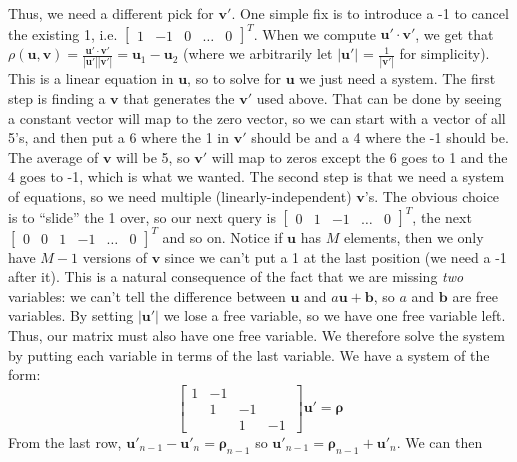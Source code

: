 \documentclass[11pt, oneside]{article}
\renewcommand{\vec}[1]{\bm{#1}}
\theoremstyle{plain}
\theoremstyle{definition}
\begin{document}
Thus, we need a different pick for \( \vec{v}' \). One simple fix is to
introduce a -1 to cancel the existing 1, i.e. \( \begin{bmatrix} 1 & -1 & 0 &
\dots & 0 \end{bmatrix}^T \). When we compute \( \vec{u}' \cdot \vec{v}' \), we
get that \( \rho(\vec{u}, \vec{v}) = \frac{\vec{u}' \cdot \vec{v}'}{|\vec{u}'|
|\vec{v}'|}= \vec{u}_1 - \vec{u}_2 \) (where we arbitrarily let \( |\vec{u}'|
\) = \( \frac{1}{|\vec{v}'|} \) for simplicity). This is a linear equation in
\( \vec{u} \), so to solve for \( \vec{u} \) we just need a system. The first
step is finding a \( \vec{v} \) that generates the \( \vec{v}' \) used above.
That can be done by seeing a constant vector will map to the zero vector, so
we can start with a vector of all 5's, and then put a 6 where the 1 in \(
\vec{v}' \) should be and a 4 where the -1 should be. The average of \( \vec{v}
\) will be 5, so \( \vec{v}' \) will map to zeros except the 6 goes to 1 and
the 4 goes to -1, which is what we wanted. The second step is that we need a
system of equations, so we need multiple (linearly-independent) \( \vec{v}
\)'s. The obvious choice is to \enquote{slide} the 1 over, so our next query
is \( \begin{bmatrix} 0 & 1 & -1 & \dots & 0 \end{bmatrix}^T \), the next
\( \begin{bmatrix} 0 & 0 & 1 & -1 & \dots & 0 \end{bmatrix}^T \) and so on.
Notice if \( \vec{u} \) has \( M \) elements, then we only have \( M - 1 \)
versions of \( \vec{v} \) since we can't put a 1 at the last position (we need
a -1 after it). This is a natural consequence of the fact that we are missing
\textit{two} variables: we can't tell the difference between \( \vec{u} \) and
\( a \vec{u} + \vec{b} \), so \( a \) and \( \vec{b} \) are free variables. By
setting \( |\vec{u}'| \) we lose a free variable, so we have one free variable
left. Thus, our matrix must also have one free variable. We therefore solve
the system by putting each variable in terms of the last variable. We have a
system of the form:
\[ \begin{bmatrix}
  1 & -1 \\
    &  1 & -1 \\
    &    &  1 & -1 \
\end{bmatrix} \vec{u}' = \vec{\rho} \]
From the last row, \( \vec{u}'_{n - 1} - \vec{u}'_n = \vec{\rho}_{n - 1} \)
so \( \vec{u}'_{n - 1} = \vec{\rho}_{n - 1} + \vec{u}'_n \). We can then
\end{document}

